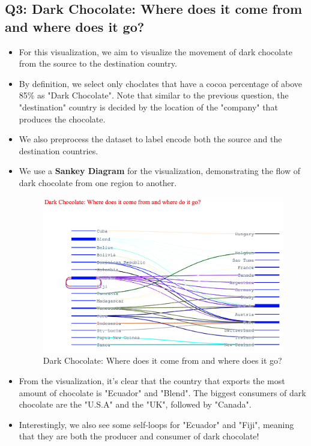 \documentclass[a4paper]{article}
\begin{document}
\subsection{Q3: Dark Chocolate: Where does it come from and where does it go?}
\begin{itemize}
    \item For this visualization, we aim to visualize the movement of dark chocolate from the source to the destination country.
    \item By definition, we select only choclates that have a cocoa percentage of above 85\% as "Dark Chocolate". Note that similar to the previous question, the "destination" country is decided by the location of the "company" that produces the chocolate.
    \item We also preprocess the dataset to label encode both the source and the destination countries.
    \item We use a \textbf{Sankey Diagram} for the visualization, demonstrating the flow of dark chocolate from one region to another.
    \begin{figure}[H]
        \centering
        \includegraphics[width=1.0\textwidth]{sankey}
        \caption{Dark Chocolate: Where does it come from and where does it go?}
        \label{fig:sankey}
    \end{figure}
    \item From the visualization, it's clear that the country that exports the most amount of chocolate is "Ecuador" and "Blend". The biggest consumers of dark chocolate are the "U.S.A" and the "UK", followed by "Canada".
    \item Interestingly, we also see some self-loops for "Ecuador" and "Fiji", meaning that they are both the producer and consumer of dark chocolate!
\end{itemize}
\end{document}
